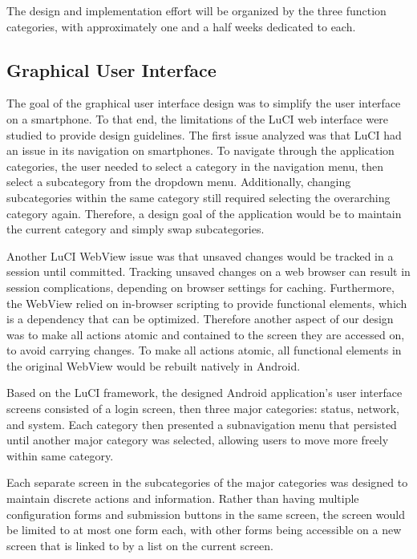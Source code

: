 \documentclass{sig-alternate-05-2015}
\begin{document}
	The design and implementation effort will be organized by the three function categories, with approximately one and a half weeks dedicated to each.
	
	\subsection{Graphical User Interface}
	The goal of the graphical user interface design was to simplify the user interface on a smartphone. To that end, the limitations of the LuCI web interface were studied to provide design guidelines. The first issue analyzed was that LuCI had an issue in its navigation on smartphones. To navigate through the application categories, the user needed to select a category in the navigation menu, then select a subcategory from the dropdown menu. Additionally, changing subcategories within the same category still required selecting the overarching category again. Therefore, a design goal of the application would be to maintain the current category and simply swap subcategories.
	
	Another LuCI WebView issue was that unsaved changes would be tracked in a session until committed. Tracking unsaved changes on a web browser can result in session complications, depending on browser settings for caching. Furthermore, the WebView relied on in-browser scripting to provide functional elements, which is a dependency that can be optimized. Therefore another aspect of our design was to make all actions atomic and contained to the screen they are accessed on, to avoid carrying changes. To make all actions atomic, all functional elements in the original WebView would be rebuilt natively in Android.
	
	Based on the LuCI framework, the designed Android application's user interface screens consisted of a login screen, then three major categories: status, network, and system. Each category then presented a subnavigation menu that persisted until another major category was selected, allowing users to move more freely within same category.
	
	Each separate screen in the subcategories of the major categories was designed to maintain discrete actions and information. Rather than having multiple configuration forms and submission buttons in the same screen, the screen would be limited to at most one form each, with other forms being accessible on a new screen that is linked to by a list on the current screen.

	
\end{document}
